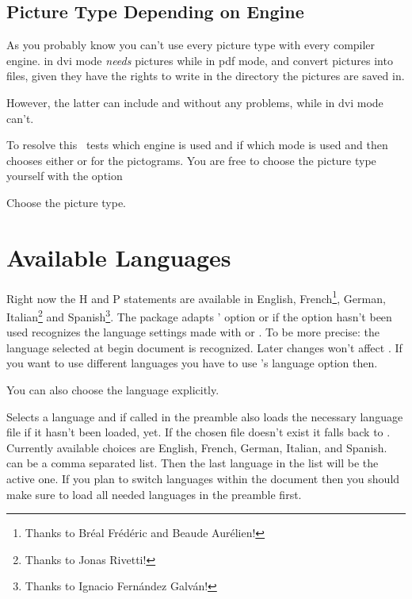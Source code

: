 \documentclass{ghsystem-manual}
\begin{document}
\subsection{Picture Type Depending on Engine}\label{ssec:picture_type}
As you probably know you can't use every picture type with every compiler
engine.  \pdfTeX{} in \acs{dvi} mode \emph{needs}  pictures while
\pdfTeX{} in \acs{pdf} mode, \XeTeX{} and \LuaTeX{} convert 
pictures into  files, given they have the rights to write in the
directory the pictures are saved in.

However, the latter can include  and  without any
problems, while \pdfTeX{} in \acs{dvi} mode can't.

To resolve this \ghsystem\ tests which engine is used and if \pdfTeX{} which
mode is used and then chooses either  or  for the
pictograms.  You are free to choose the picture type yourself with the option
\begin{options}
    Choose the picture type.
\end{options}

\section{Available Languages}\label{sec:ghsystem_language}
Right now the H and P statements are available in English,
French\footnote{Thanks to Bréal Frédéric and Beaude Aurélien!}, German,
Italian\footnote{Thanks to Jonas Rivetti!} and Spanish\footnote{Thanks to
  Ignacio Fernández Galván!}.  The package adapts ' option
 or if the option hasn't been used recognizes the language
settings made with  or .  To be more precise: the
language selected at begin document is recognized.  Later changes won't affect
\ghsystem.  If you want to use different languages you have to use \ghsystem's
language option then.

You can also choose the language explicitly.
\begin{options}
    Selects a language and if called in the preamble also loads the necessary
    language file if it hasn't been loaded, yet.  If the chosen file doesn't
    exist it falls back to  .  Currently available choices are
    English, French, German, Italian, and Spanish.   can be a comma
    separated list.  Then the last language in the list will be the active
    one.  If you plan to switch languages within the document then you should
    make sure to load all needed languages in the preamble first.
\end{options}
\begin{example}

\end{example}
\end{document}
